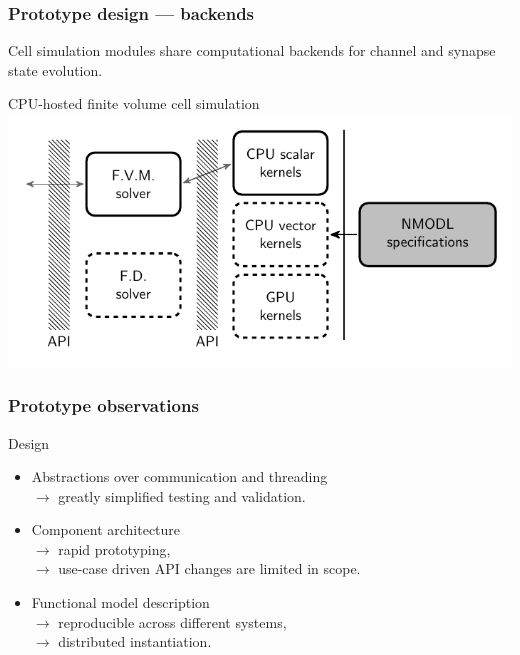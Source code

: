 \documentclass[aspectratio=43,12pt]{beamer}
\newcommand{\subheading}[1]{{\large #1}}
\begin{document}
\begin{frame}
\frametitle{Prototype design --- backends}

Cell simulation modules share computational backends for channel
and synapse state evolution.

\vfill
\centering
CPU-hosted finite volume cell simulation\\
\vspace{2ex}
\includegraphics[height=0.5\textheight]{backend-api.pdf}

\vfill
\end{frame}

\begin{frame}
\frametitle{Prototype observations}
\subheading{Design}

\vfill
\begin{itemize}
\item Abstractions over communication and threading\\
\hspace{5mm} $\to$ greatly simplified testing and validation.
\item Component architecture\\
\hspace{5mm} $\to$ rapid prototyping,\\
\hspace{5mm} $\to$ use-case driven API changes are limited in scope.
\item Functional model description\\
\hspace{5mm} $\to$ reproducible across different systems,\\
\hspace{5mm} $\to$ distributed instantiation.
\end{itemize}
\vfill
\end{frame}
\end{document}
